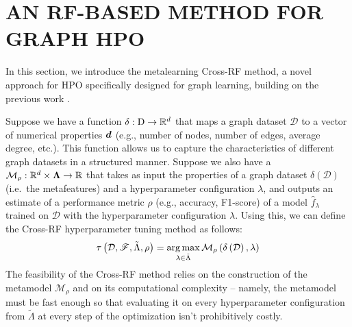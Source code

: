 \section{\uppercase{An RF-based Method for Graph HPO}}
\label{sec:cross-rf}

In this section, we introduce the metalearning Cross-RF method, a novel approach for HPO specifically designed for graph learning, building on the previous work \cite{prochazka_which_2023}.

Suppose we have a  function \( \delta : \mathrm{D} \to \mathbb{R}^d \) that maps a graph dataset \( \mathcal{D} \) to a vector of numerical properties \( \boldsymbol{d} \) (e.g., number of nodes, number of edges, average degree, etc.). This function allows us to capture the characteristics of different graph datasets in a structured manner. Suppose we also have a  \( \mathcal{M}_\rho : \mathbb{R}^d \times \boldsymbol\Lambda \to \mathbb{R} \) that takes as input the properties of a graph dataset \( \delta \left( \mathcal{D} \right) \) (i.e.\ the metafeatures) and a hyperparameter configuration \( \lambda \), and outputs an estimate of a performance metric \( \rho \) (e.g., accuracy, F1-score) of a model \( \hat{f}_\lambda \) trained on \( \mathcal{D} \) with the hyperparameter configuration \( \lambda \). Using this, we can define the Cross-RF hyperparameter tuning method as follows:
\begin{equation*}
	\tau \left( \mathcal{D}, \mathscr{F}, \tilde{\Lambda}, \rho \right) = \operatorname*{arg\,max}_{\lambda \in \tilde{\Lambda}} \mathcal{M}_\rho \left( \delta \left( \mathcal{D} \right), \lambda \right)
\end{equation*}
The feasibility of the Cross-RF method relies on the construction of the metamodel \( \mathcal{M}_\rho \) and on its computational complexity -- namely, the metamodel must be fast enough so that evaluating it on every hyperparameter configuration from \( \tilde{\Lambda} \) at every step of the optimization isn't prohibitively costly.

